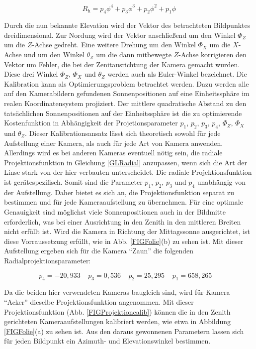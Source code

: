 \documentclass[a4paper,11pt,twoside,german]{article}
\newcommand{\absatz}{\smallbreak}
\begin{document}
\begin{equation}
\label{GLRadial}
R_\mathrm{h} = p_4 \phi ^ 4 + p_3 \phi ^ 3 + p_2 \phi ^ 2 + p_1 \phi
\end{equation}

Durch die nun bekannte Elevation wird der Vektor des betrachteten Bildpunktes
dreidimensional. Zur Nordung wird der Vektor anschließend um den Winkel $\Phi_Z$
um die $Z$-Achse gedreht. Eine weitere Drehung um den Winkel $\Phi_X$ um die
$X$-Achse und um den Winkel $\theta_Z$ um die dann mitbewegte $Z$-Achse
korrigieren den Vektor um Fehler, die bei der Ze\-nit\-aus\-rich\-tung der
Kamera gemacht wurden. Diese drei Winkel $\Phi_Z$, $\Phi_X$ und $\theta_Z$
werden auch als Euler-Winkel bezeichnet.
\absatz
Die Kalibration kann als Optimierungsproblem betrachtet werden. Dazu
werden alle auf den Kamerabildern gefundenen Sonnenpositionen auf eine
Einheitssphäre im realen Koordinatensystem projiziert. Der mittlere quadratische
Abstand zu den tatsächlichen Sonnenpositionen auf der Einheitssphäre ist die zu
optimierende Kostenfunktion in Ab\-häng\-ig\-keit der Projetionsparameter $p_1$,
$p_2$, $p_3$, $p_4$, $\Phi_Z$, $\Phi_X$ und $\theta_Z$.
\absatz
Dieser Kalibrationsansatz lässt sich theoretisch sowohl für jede Aufstellung
einer Kamera, als auch für jede Art von Kamera anwenden. Allerdings wird es bei
anderen Kameras eventuell nötig sein, die radiale Projektionsfunktion in
Gleichung \ref{GLRadial} anzupassen, wenn sich die Art der Linse stark von der
hier verbauten unterscheidet.
\absatz
Die radiale Projektionsfunktion ist gerätespezifisch. Somit sind die Parameter 
$p_1$, $p_2$, $p_3$ und $p_4$ unabhängig von der Aufstellung. Daher bietet es
sich an, die Projektionsfunktion separat zu bestimmen und für jede
Kameraaufstellung zu übernehmen. Für eine optimale Genauigkeit sind
möglichst viele Sonnenpositionen auch in der Bildmitte erforderlich, was bei
einer Ausrichtung in den Zenith in den mittleren Breiten nicht erfüllt ist.
Wird die Kamera in Richtung der Mittagssonne ausgerichtet, ist diese
Vorraussetzung erfüllt, wie in Abb. \ref{FIGFolie}(b) zu sehen ist.
Mit dieser Aufstellung ergeben sich für die Kamera \enquote{Zaun} 
die folgenden Radialprojektionsparameter:

\begin{equation}
p_4 = -20,933 \;\;\;\;
p_3 = 0,536   \;\;\;\;
p_2 = 25,295  \;\;\;\;
p_1 = 658,265 \;\;\;\;
\end{equation}

Da die beiden hier verwendeten Kameras baugleich sind, wird für Kamera
\enquote{Acker} dieselbe Projektionsfunktion angenommen.  Mit dieser
Projektionsfunktion (Abb. \ref{FIGProjektioncalib}) können die in den Zenith
gerichteten Kameraaufstellungen kalibriert werden, wie etwa in Abbildung
\ref{FIGFolie}(a) zu sehen ist. Aus den daraus gewonnenen Parametern lassen sich
für jeden Bildpunkt ein Azimuth- und Elevationswinkel bestimmen. 
\end{document}
